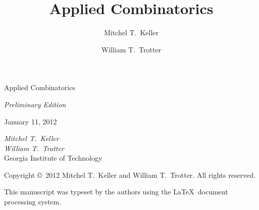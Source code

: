 \documentclass[10pt,letterpaper,chapterprefix]{scrbook}
\numberwithin{figure}{chapter}
\numberwithin{section}{chapter}
\begin{document}
\begin{titlepage}
\begin{center}
\parbox{1in}{}

\vspace{.6in}
\Huge{\textsf{Applied Combinatorics}}

\vspace{24pt}
\LARGE{\textsf{\textsl{Preliminary Edition}}}
\vspace{36pt}

\Large{\textsf{January 11, 2012}}

\vspace{3in} \LARGE{\textsf{\textsl{Mitchel T.\ Keller}}\\\textsf{\textsl{William T.\ Trotter}}}\\
  \Large{\textsf{Georgia Institute of Technology}}
\end{center}
\end{titlepage}
\thispagestyle{empty}
\parbox{1in}{ }
\vskip4.75in

\begin{center}
  \textsf{Copyright \copyright\ 2012 Mitchel T.\ Keller and William
    T.\ Trotter. All rights reserved.}

  \vspace{12pt}
  
  \textsf{This manuscript was typeset by the authors using the 
    \LaTeX\ document processing system.}
\end{center}


\author{Mitchel T.\ Keller}
\author{William T.\ Trotter}
\title{Applied Combinatorics}
\pagestyle{scrheadings}
\frontmatter

\setcounter{tocdepth}{1}
\tableofcontents


\end{document}

